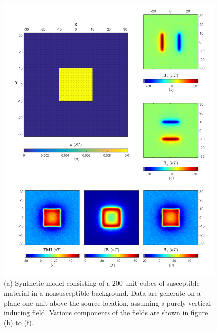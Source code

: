 \begin{figure}[h!]
\includegraphics[scale=0.60]{ES_Li_True}
\caption{(a) Synthetic model consisting of a $200$ unit cubes of susceptible material in a nonsusceptible background. Data are generate on a plane one unit above the source location, assuming a purely vertical inducing field. Various components of the fields are shown in figure (b) to (f). }
\label{fig:ES_Li_True}
\end{figure}

